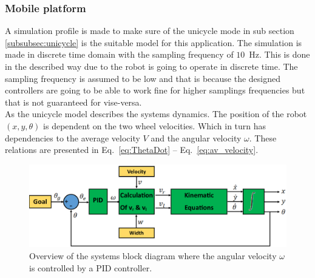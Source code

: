 \subsubsection{Mobile platform}
A simulation profile is made to make sure of the unicycle mode in sub section \ref{subsubsec:unicycle} is the suitable model for this application.
The simulation is made in discrete time domain with the sampling frequency of $10$~Hz.
This is done in the described way due to the robot is going to operate in discrete time.
The sampling frequency is assumed to be low and that is because the designed controllers are going to be able to work fine for higher samplings frequencies but that is not guaranteed for vise-versa.\\  
As the unicycle model describes the systems dynamics.
The position of the robot $(x, y, \theta)$ is dependent on the two wheel velocities. Which in turn has dependencies to the average velocity $V$ and the angular velocity $\omega$. These relations are presented in Eq.~\eqref{eq:ThetaDot} -- Eq.~\eqref{eq:av_velocity}.
\begin{figure}[ht]
\centering
\includegraphics[width=\textwidth]{sections/assets/omegaCtrlr.png}
\caption{Overview of the systems block diagram where the angular velocity $\omega$ is controlled by a PID controller.}
\label{fig:overview}
\end{figure} 

